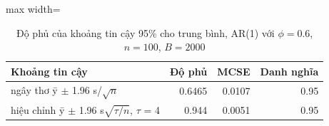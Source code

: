 \begin{table}[H]
\centering\footnotesize
\caption{Độ phủ của khoảng tin cậy 95\% cho trung bình, AR(1) với $\phi=0.6$, $n=100$, $B=2000$}\label{tab:tab_b11_03_coverage}
\begin{adjustbox}{max width=\linewidth}
\begin{tabular}{|>{\raggedright\arraybackslash}p{}|r|r|r|}
\toprule
Khoảng tin cậy & Độ phủ & MCSE & Danh nghĩa \\
\midrule
ngây thơ  ȳ $\pm$ 1.96 s/$\sqrt{n}$ & 0.6465 & 0.0107 & 0.95 \\[3pt]
hiệu chỉnh  ȳ $\pm$ 1.96 s$\sqrt{\tau/n}$, $\tau$ = 4 & 0.944 & 0.0051 & 0.95 \\[3pt]
\bottomrule
\end{tabular}
\end{adjustbox}\par{}
\end{table}

